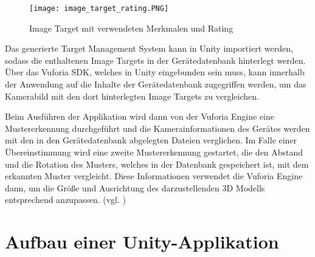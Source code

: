 \begin{figure} [h]
\centering
\texttt{[image: image\_target\_rating.PNG]}
\caption{Image Target mit verwendeten Merkmalen und Rating}
\label{fig:image_target_rating}
\end{figure}
 
Das generierte Target Management System kann in Unity importiert werden, sodass die enthaltenen Image Targets in der Gerätedatenbank hinterlegt werden. 
Über das Vuforia SDK, welches in Unity eingebunden sein muss, kann innerhalb der Anwendung auf die Inhalte der Gerätedatenbank zugegriffen werden, um das Kamerabild mit den dort hinterlegten Image Targets zu vergleichen.

Beim Ausführen der Applikation wird dann von der Vuforia Engine eine Mustererkennung durchgeführt und die Kamerainformationen des Gerätes werden mit den in den Gerätedatenbank abgelegten Dateien verglichen. 
Im Falle einer Übereinstimmung wird eine zweite Mustererkennung gestartet, die den Abstand und die Rotation des Musters, welches in der Datenbank gespeichert ist, mit dem erkannten Muster vergleicht.
Diese Informationen verwendet die Vuforia Engine dann, um die Größe und Ausrichtung des darzustellenden 3D Modells entsprechend anzupassen. (vgl. \cite{Grahn2017})
\section{Aufbau einer Unity-Applikation}